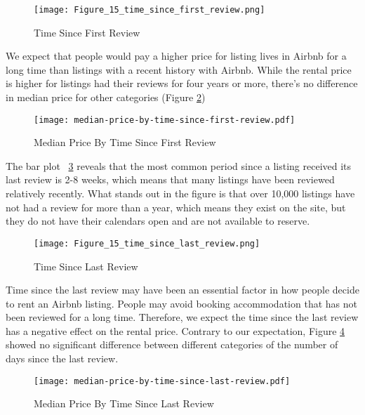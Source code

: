 \begin{figure}[!htbp]\centering
    \texttt{[image: Figure\_15\_time\_since\_first\_review.png]}
    \caption{Time Since First Review}
    \label{fig:time_since_first_review}
\end{figure}

We expect that people would pay a higher price for listing lives in Airbnb for a
long time than listings with a recent history with Airbnb.
While the rental price is higher for listings had their reviews for four years
or more, there's no difference in median price for other categories
(Figure \ref{fig:time_since_first_review_price})

\begin{figure}[!htbp]\centering
    \texttt{[image: median-price-by-time-since-first-review.pdf]}
    \caption{Median Price By Time Since First Review}
    \label{fig:time_since_first_review_price}
\end{figure}

The bar plot ~\ref{fig:time_since_last_review} reveals that the most
common period since a listing received its last review is 2-8 weeks, which means
that many listings have been reviewed relatively recently.  What stands out in
the figure is that over 10,000 listings have not had a review for more than a
year, which means they exist on the site, but they do not have their calendars
open and are not available to reserve.

\begin{figure}[!htbp]\centering
    \texttt{[image: Figure\_15\_time\_since\_last\_review.png]}
    \caption{Time Since Last Review}
    \label{fig:time_since_last_review}
\end{figure}

Time since the last review may have been an essential factor in how people
decide to rent an Airbnb listing. People may avoid booking accommodation that
has not been reviewed for a long time. Therefore, we expect the time since the
last review has a negative effect on the rental price. Contrary to our
expectation, Figure \ref{fig:time_since_last_review_price} showed no significant
difference between different categories of the number of days since the last
review.

\begin{figure}[!htbp]\centering
    \texttt{[image: median-price-by-time-since-last-review.pdf]}
        \caption{Median Price By Time Since Last Review}
        \label{fig:time_since_last_review_price}
\end{figure}

